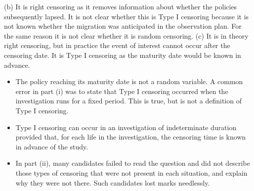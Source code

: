 \documentclass[a4paper,12pt]{article}
\begin{document}
(b)
It is right censoring as it removes information about whether the policies subsequently lapsed.
It is not clear whether this is Type I censoring because it is not known whether the migration was anticipated in the observation plan.
For the same reason it is not clear whether it is random censoring.
(c)
It is in theory right censoring, but in practice the event of interest cannot occur after the censoring date.
It is Type I censoring as the maturity date would be known in advance.
\begin{itemize}
    \item The policy reaching its maturity date is not a random variable.
A common error in part (i) was to state that Type I censoring occurred when
the investigation runs for a fixed period. This is true, but is not a definition of
Type I censoring. 
\item Type I censoring can occur in an investigation of
indeterminate duration provided that, for each life in the investigation, the
censoring time is known in advance of the study.
\item In part (ii), many candidates
failed to read the question and did not describe those types of censoring that
were not present in each situation, and explain why they were not there.
Such candidates lost marks needlessly. 
\end{itemize}


\end{document}
